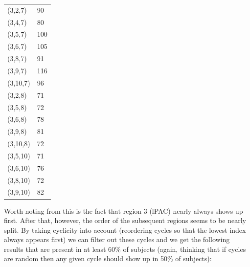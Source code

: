 \documentclass[11pt]{article}
\begin{document}
\begin{minipage}{.3\textwidth}
\begin{tabular}{ll}
(3,2,7) & 90 \\
(3,4,7) & 80 \\
(3,5,7) & 100 \\
(3,6,7) & 105 \\
(3,8,7) & 91 \\
(3,9,7) & 116 \\
(3,10,7) & 96 \\
(3,2,8) & 71 \\
(3,5,8) & 72 \\
(3,6,8) & 78 \\
(3,9,8) & 81 \\
(3,10,8) & 72 \\
(3,5,10) & 71 \\
(3,6,10) & 76 \\
(3,8,10) & 72 \\
(3,9,10) & 82 \\
\end{tabular}
\end{minipage}
\vskip 10pt

Worth noting from this is the fact that region 3 (lPAC) nearly always shows up first. After that, however, the order of the subsequent regions seems to be nearly split. By taking cyclicity into account (reordering cycles so that the lowest index always appears first) we can filter out these cycles and we get the following results that are present in at least 60\% of subjects (again, thinking that if cycles are random then any given cycle should show up in 50\% of subjects):
\end{document}
